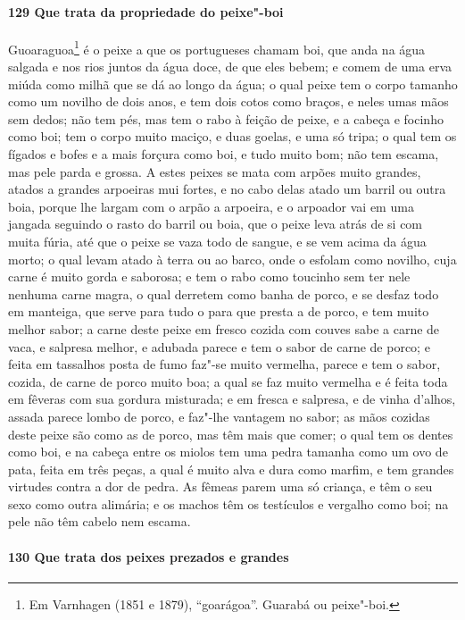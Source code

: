 \paragraph{129 Que trata da propriedade do peixe"-boi}

Guoaraguoa\footnote{ Em Varnhagen (1851 e 1879), ``goarágoa''. Guarabá ou peixe"-boi.} é o
peixe a que os portugueses chamam boi, que anda na água salgada e nos rios juntos da água
doce, de que eles bebem; e comem de uma erva miúda como milhã que se dá ao longo da água;
o qual peixe tem o corpo tamanho como um novilho de dois anos, e tem dois cotos como
braços, e neles umas mãos sem dedos; não tem pés, mas tem o rabo à feição de peixe, e a
cabeça e focinho como boi; tem o corpo muito maciço, e duas goelas, e uma só tripa; o qual
tem os fígados e bofes e a mais forçura como boi, e tudo muito bom; não tem escama, mas
pele parda e grossa. A estes peixes se mata com arpões muito grandes, atados a grandes
arpoeiras mui fortes, e no cabo delas atado um barril ou outra boia, porque lhe largam com
o arpão a arpoeira, e o arpoador vai em uma jangada seguindo o rasto do barril ou boia,
que o peixe leva atrás de si com muita fúria, até que o peixe se vaza todo de sangue, e se
vem acima da água morto; o qual levam atado à terra ou ao barco, onde o esfolam como
novilho, cuja carne é muito gorda e saborosa; e tem o rabo como toucinho sem ter nele
nenhuma carne magra, o qual derretem como banha de porco, e se desfaz todo em manteiga,
que serve para tudo o para que presta a de porco, e tem muito melhor sabor; a carne deste
peixe em fresco cozida com couves sabe a carne de vaca, e salpresa melhor, e adubada
parece e tem o sabor de carne de porco; e feita em tassalhos posta de fumo faz"-se muito
vermelha, parece e tem o sabor, cozida, de carne de porco muito boa; a qual se faz muito
vermelha e é feita toda em fêveras com sua gordura misturada; e em fresca e salpresa, e de
vinha d'alhos, assada parece lombo de porco, e faz"-lhe vantagem no sabor; as mãos cozidas
deste peixe são como as de porco, mas têm mais que comer; o qual tem os dentes como boi, e
na cabeça entre os miolos tem uma pedra tamanha como um ovo de pata, feita em três peças,
a qual é muito alva e dura como marfim, e tem grandes virtudes contra a dor de pedra. As
fêmeas parem uma só criança, e têm o seu sexo como outra alimária; e os machos têm os
testículos e vergalho como boi; na pele não têm cabelo nem escama.

\paragraph{130 Que trata dos peixes prezados e grandes}

